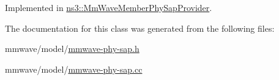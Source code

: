 Implemented in \hyperlink{classns3_1_1MmWaveMemberPhySapProvider_a797920e46ee946f861c25d4595622e91}{ns3\+::\+Mm\+Wave\+Member\+Phy\+Sap\+Provider}.



The documentation for this class was generated from the following files\+:\begin{DoxyCompactItemize}
\item 
mmwave/model/\hyperlink{mmwave-phy-sap_8h}{mmwave-\/phy-\/sap.\+h}\item 
mmwave/model/\hyperlink{mmwave-phy-sap_8cc}{mmwave-\/phy-\/sap.\+cc}\end{DoxyCompactItemize}
